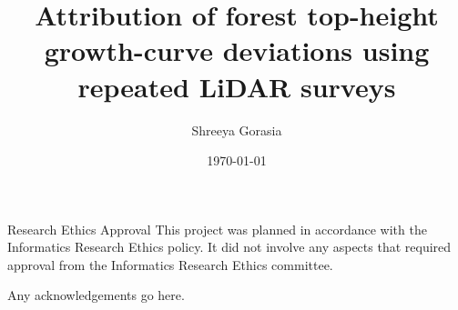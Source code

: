 \documentclass[logo,msc,ai]{infthesis}           %
\begin{document}
\begin{preliminary}

\title{Attribution of forest top-height growth-curve deviations using repeated LiDAR surveys}

\author{Shreeya Gorasia}

\date{\today}



\maketitle

\newenvironment{ethics}
   {\begin{frontenv}{Research Ethics Approval}{\LARGE}}
   {\end{frontenv}\newpage}

\begin{ethics}
This project was planned in accordance with the Informatics Research
Ethics policy. It did not involve any aspects that required approval
from the Informatics Research Ethics committee.

\standarddeclaration
\end{ethics}


\begin{acknowledgements}
Any acknowledgements go here.
\end{acknowledgements}


\tableofcontents
\end{preliminary}

\end{document}
